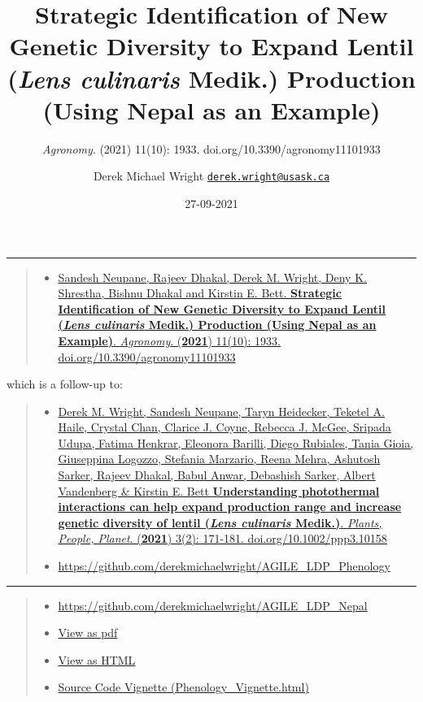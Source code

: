 \documentclass[
]{article}
\title{Strategic Identification of New Genetic Diversity to Expand
Lentil (\emph{Lens culinaris} Medik.) Production (Using Nepal as an
Example)}
\subtitle{\emph{Agronomy}. (2021) 11(10): 1933.
doi.org/10.3390/agronomy11101933}
\author{Derek Michael Wright
\href{mailto:derek.wright@usask.ca}{\nolinkurl{derek.wright@usask.ca}}}
\date{27-09-2021}
\providecommand{\tightlist}{%
  \setlength{\itemsep}{0pt}\setlength{\parskip}{0pt}}
\begin{document}
\maketitle

{
\setcounter{tocdepth}{2}
\tableofcontents
}
\begin{center}\rule{0.5\linewidth}{0.5pt}\end{center}

\pagebreak

\begin{quote}
\begin{itemize}
\tightlist
\item
  \href{https://doi.org/10.3390/agronomy11101933}{Sandesh Neupane,
  Rajeev Dhakal, Derek M. Wright, Deny K. Shrestha, Bishnu Dhakal and
  Kirstin E. Bett. \textbf{Strategic Identification of New Genetic
  Diversity to Expand Lentil (\emph{Lens culinaris} Medik.) Production
  (Using Nepal as an Example)}. \emph{Agronomy}. (\textbf{2021}) 11(10):
  1933. doi.org/10.3390/agronomy11101933}
\end{itemize}
\end{quote}

which is a follow-up to:

\begin{quote}
\begin{itemize}
\tightlist
\item
  \href{https://doi.org/10.1002/ppp3.10158}{Derek M. Wright, Sandesh
  Neupane, Taryn Heidecker, Teketel A. Haile, Crystal Chan, Clarice J.
  Coyne, Rebecca J. McGee, Sripada Udupa, Fatima Henkrar, Eleonora
  Barilli, Diego Rubiales, Tania Gioia, Giuseppina Logozzo, Stefania
  Marzario, Reena Mehra, Ashutosh Sarker, Rajeev Dhakal, Babul Anwar,
  Debashish Sarker, Albert Vandenberg \& Kirstin E. Bett
  \textbf{Understanding photothermal interactions can help expand
  production range and increase genetic diversity of lentil (\emph{Lens
  culinaris} Medik.)}. \emph{Plants, People, Planet}. (\textbf{2021})
  3(2): 171-181. doi.org/10.1002/ppp3.10158}
\item
  \url{https://github.com/derekmichaelwright/AGILE_LDP_Phenology}
\end{itemize}
\end{quote}

\begin{center}\rule{0.5\linewidth}{0.5pt}\end{center}

\begin{quote}
\begin{itemize}
\tightlist
\item
  \url{https://github.com/derekmichaelwright/AGILE_LDP_Nepal}
\item
  \href{https://github.com/derekmichaelwright/AGILE_LDP_Nepal/raw/master/README.pdf}{View
  as pdf}
\item
  \href{https://derekmichaelwright.github.io/AGILE_LDP_Nepal/README.html}{View
  as HTML}
\item
  \href{https://derekmichaelwright.github.io/AGILE_LDP_Nepal/Phenology_Vignette.html}{Source
  Code Vignette (Phenology\_Vignette.html)}
\end{itemize}
\end{quote}
\end{document}
